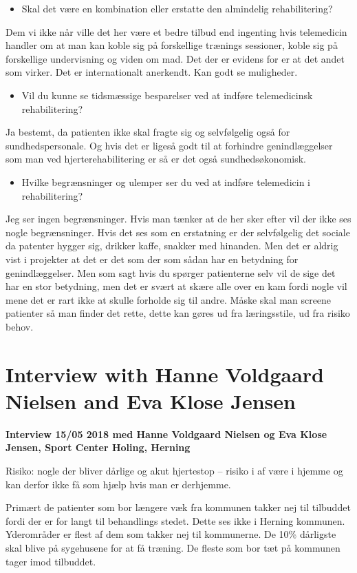 \begin{itemize}
	\item Skal det være en kombination eller erstatte den almindelig rehabilitering?
\end{itemize}  
Dem vi ikke når ville det her være et bedre tilbud end ingenting hvis telemedicin handler om at man kan koble sig på forskellige trænings sessioner, koble sig på forskellige undervisning og viden om mad. Det der er evidens for er at det andet som virker. Det er internationalt anerkendt. Kan godt se muligheder. 

\begin{itemize}
	\item Vil du kunne se tidsmæssige besparelser ved at indføre telemedicinsk rehabilitering?
\end{itemize} 
Ja bestemt, da patienten ikke skal fragte sig og selvfølgelig også for sundhedspersonale. Og hvis det er ligeså godt til at forhindre genindlæggelser som man ved hjerterehabilitering er så er det også sundhedsøkonomisk. 

\begin{itemize}
	\item Hvilke begrænsninger og ulemper ser du ved at indføre telemedicin i rehabilitering? 
\end{itemize} 
Jeg ser ingen begrænsninger. Hvis man tænker at de her sker efter vil der ikke ses nogle begrænsninger. Hvis det ses som en erstatning er der selvfølgelig det sociale da patenter hygger sig, drikker kaffe, snakker med hinanden. Men det er aldrig vist i projekter at det er det som der som sådan har en betydning for genindlæggelser. Men som sagt hvis du spørger patienterne selv vil de sige det har en stor betydning, men det er svært at skære alle over en kam fordi nogle vil mene det er rart ikke at skulle forholde sig til andre. Måske skal man screene patienter så man finder det rette, dette kan gøres ud fra læringsstile, ud fra risiko behov. 

\chapter{Interview with Hanne Voldgaard Nielsen and Eva Klose Jensen}
\textbf{Interview 15/05 2018 med Hanne Voldgaard Nielsen og Eva Klose Jensen, Sport Center Holing, Herning}

Risiko: nogle der bliver dårlige og akut hjertestop – risiko i af være i hjemme og kan derfor ikke få som hjælp hvis man er derhjemme. 

Primært de patienter som bor længere væk fra kommunen takker nej til tilbuddet fordi der er for langt til behandlings stedet. Dette ses ikke i Herning kommunen. Yderområder er flest af dem som takker nej til kommunerne. De 10\% dårligste skal blive på sygehusene for at få træning. De fleste som bor tæt på kommunen tager imod tilbuddet. 

